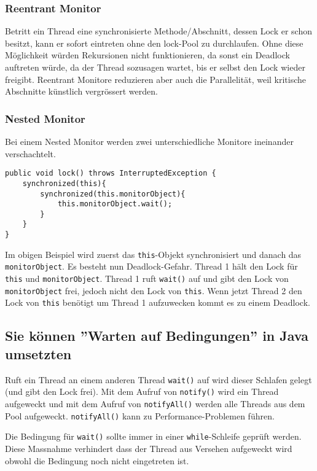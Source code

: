 \subsubsection{Reentrant Monitor}

Betritt ein Thread eine synchronisierte Methode/Abschnitt, dessen Lock er schon besitzt, kann er sofort eintreten ohne den lock-Pool zu durchlaufen. Ohne diese Möglichkeit würden Rekursionen nicht funktionieren, da sonst ein Deadlock auftreten würde, da der Thread sozusagen wartet, bis er selbst den Lock wieder freigibt. 
Reentrant Monitore reduzieren aber auch die Parallelität, weil kritische Abschnitte künstlich vergrössert werden.

\subsubsection{Nested Monitor}

Bei einem Nested Monitor werden zwei unterschiedliche Monitore ineinander verschachtelt.

\begin{lstlisting}[caption={Nested Monitor},label=lst:nested_monitor]
public void lock() throws InterruptedException {
	synchronized(this){
		synchronized(this.monitorObject){
			this.monitorObject.wait();
		}
	}
}
\end{lstlisting}

Im obigen Beispiel wird zuerst das \texttt{this}-Objekt synchronisiert und danach das \texttt{monitorObject}. Es besteht nun Deadlock-Gefahr. Thread 1 hält den Lock für \texttt{this} und \texttt{monitorObject}. Thread 1 ruft \texttt{wait()} auf und gibt den Lock von \texttt{monitorObject} frei, jedoch nicht den Lock von \texttt{this}. Wenn jetzt Thread 2 den Lock von \texttt{this} benötigt um Thread 1 aufzuwecken kommt es zu einem Deadlock.

\subsection{Sie können ''Warten auf Bedingungen'' in Java umsetzten}

Ruft ein Thread an einem anderen Thread \texttt{wait()} auf wird dieser Schlafen gelegt (und gibt den Lock frei). Mit dem Aufruf von \texttt{notify()} wird ein Thread aufgeweckt und mit dem Aufruf von \texttt{notifyAll()} werden alle Threads aus dem Pool aufgeweckt. \texttt{notifyAll()} kann zu Performance-Problemen führen. 

Die Bedingung für \texttt{wait()} sollte immer in einer \texttt{while}-Schleife geprüft werden. Diese Massnahme verhindert dass der Thread aus Versehen aufgeweckt wird obwohl die Bedingung noch nicht eingetreten ist. 

